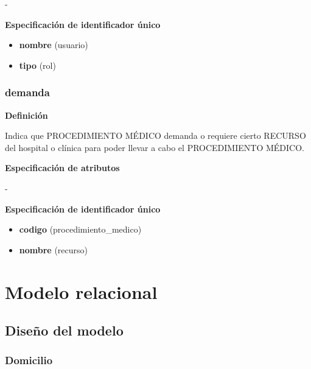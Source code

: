\documentclass[a4paper,11pt]{article}
\begin{document}
-

\textbf{Especificación de identificador único}

\begin{itemize}

     \item \textbf{nombre} (usuario)

     \item \textbf{tipo} (rol)

\end{itemize}

\subsubsection{\textbf{demanda}}

\textbf{Definición}

Indica que PROCEDIMIENTO MÉDICO demanda o requiere cierto RECURSO del hospital o clínica
para poder llevar a cabo el PROCEDIMIENTO MÉDICO.

\textbf{Especificación de atributos}

-

\textbf{Especificación de identificador único}

\begin{itemize}

     \item \textbf{codigo} (procedimiento\_medico)

     \item \textbf{nombre} (recurso)

\end{itemize}

\newpage

\section{\textbf{Modelo relacional\label{HToc293405831}}}

\subsection{\textbf{Diseño del modelo\label{HToc293405832}}}

\subsubsection{\textbf{Domicilio}}
\end{document}
